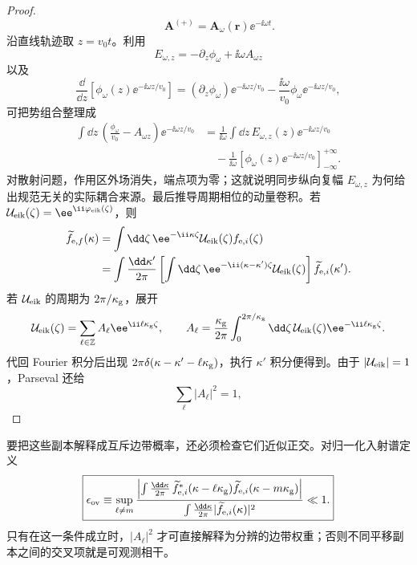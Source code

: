\begin{proof}
\begin{equation*}
\qquad
\mathbf A^{(+)}=\mathbf A_\omega(\mathbf r)\ee^{-\ii\omega t}.
\end{equation*}
沿直线轨迹取 $z=v_0t$。利用
\begin{equation*}
E_{\omega,z}=-\partial_z\phi_\omega+\ii\omega A_{\omega z}
\end{equation*}
以及
\begin{equation*}
\frac{\dd}{\dd z}
\left[\phi_\omega(z)\ee^{-\ii\omega z/v_0}\right]
=(\partial_z\phi_\omega)\ee^{-\ii\omega z/v_0}
-\frac{\ii\omega}{v_0}\phi_\omega\ee^{-\ii\omega z/v_0},
\end{equation*}
可把势组合整理成
\begin{align*}
\int\dd z\,
\left(\frac{\phi_\omega}{v_0}-A_{\omega z}\right)
\ee^{-\ii\omega z/v_0}
&=\frac{1}{\ii\omega}
\int\dd z\,E_{\omega,z}(z)
\ee^{-\ii\omega z/v_0}\\
&\quad
-\frac{1}{\ii\omega}
\left[\phi_\omega(z)\ee^{-\ii\omega z/v_0}\right]_{-\infty}^{+\infty}.
\end{align*}
对散射问题，作用区外场消失，端点项为零；这就说明同步纵向复幅 $E_{\omega,z}$ 为何给出规范无关的实际耦合来源。最后推导周期相位的动量卷积。若 $\mathcal U_{\rm eik}(\zeta)=\ee^{\ii\varphi_{\rm eik}(\zeta)}$，则
\begin{align*}
\widetilde f_{\mathrm e,f}(\kappa)
&=\int\dd\zeta\,\ee^{-\ii \kappa\zeta}
\mathcal U_{\rm eik}(\zeta)f_{\mathrm e,i}(\zeta)\\
&=\int\frac{\dd \kappa'}{2\pi}
\left[\int\dd\zeta\,
 \ee^{-\ii(\kappa-\kappa')\zeta}\mathcal U_{\rm eik}(\zeta)\right]
\widetilde f_{\mathrm e,i}(\kappa').
\end{align*}
若 $\mathcal U_{\rm eik}$ 的周期为 $2\pi/\kappa_{\rm g}$，展开
\begin{equation*}
\mathcal U_{\rm eik}(\zeta)=\sum_{\ell\in\mathbb Z}A_\ell \ee^{\ii\ell\kappa_{\rm g}\zeta},
\qquad
A_\ell=\frac{\kappa_{\rm g}}{2\pi}
\int_0^{2\pi/\kappa_{\rm g}}\dd\zeta\,
\mathcal U_{\rm eik}(\zeta)\ee^{-\ii\ell\kappa_{\rm g}\zeta}.
\end{equation*}
代回 Fourier 积分后出现
$2\pi\delta(\kappa-\kappa'-\ell\kappa_{\rm g})$，执行 $\kappa'$ 积分便得到。由于 $|\mathcal U_{\rm eik}|=1$，Parseval 还给
\begin{equation*}
\sum_\ell|A_\ell|^2=1,
\end{equation*}
\end{proof}


要把这些副本解释成互斥边带概率，还必须检查它们近似正交。对归一化入射谱定义
\begin{equation}
\boxed{
\epsilon_{\rm ov}
\equiv\sup_{\ell\neq m}
\frac{\left|\int\frac{\dd \kappa}{2\pi}\,
\widetilde f_{\mathrm e,i}^*(\kappa-\ell\kappa_{\rm g})\widetilde f_{\mathrm e,i}(\kappa-m\kappa_{\rm g})\right|}
{\int\frac{\dd \kappa}{2\pi}|\widetilde f_{\mathrm e,i}(\kappa)|^2}\ll1.}
\label{eq:translated_packet_overlap_condition}
\end{equation}
只有在这一条件成立时，$|A_\ell|^2$ 才可直接解释为分辨的边带权重；否则不同平移副本之间的交叉项就是可观测相干。

